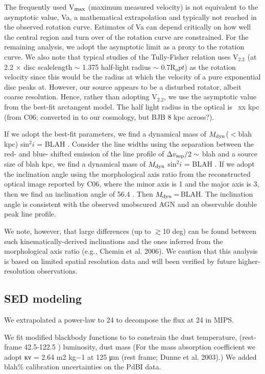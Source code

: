\documentclass[]{emulateapj}
\begin{document}
The frequently used V$_{\rm max}$ (maximum measured velocity) is not equivalent to the
asymptotic value, Va, a mathematical extrapolation and typically not reached in
the observed rotation curve. Estimates of Va can depend critically on how well
the central region and turn over of the rotation curve are constrained. For the
remaining analysis, we adopt the asymptotic limit as a proxy to the rotation
curve. We also note that typical studies of the Tully-Fisher relation uses V$_2.2$ (at 2.2 $\times$ disc scalelength $\sim$ 1.375 half-light radius $\sim$ 0.7R$_opt$) as the rotation
velocity since this would be the radius at which the velocity of a pure
exponential disc peaks at. However, our source appears to be a disturbed
rotator, albeit coarse resolution. Hence, rather than adopting V$_2.2$, we use the
asymptotic value from the best-fit arctangent model. The half light radius in the
optical is ~xx kpc (from C06; converted in to our cosmology, but BJB 8 kpc
across?).

If we adopt the best-fit parameters, we find a dynamical mass of $M_{\rm dyn}$($<$blah kpc) sin$^2 i$ = BLAH \Msun. Consider the line widths using the separation between
the red- and blue- shifted emission of the \bco line profile of $\Delta v_{\rm sep}/2 \sim$ blah \kms and a source size of blah kpc, we find a dynamical mass of $M_{\rm dyn}$
sin$^2 i$ = BLAH \Msun. If we adopt the inclination angle using the morphological axis ratio from the
reconstructed optical image reported by C06, where the minor axis is 1 and the major axis is 3, then we find an inclination angle of 56.4
\degr. Then $M_{\rm dyn}$\,=\,BLAH. The inclination angle is consistent with the observed unobscured AGN and an observable double peak line profile.

We note, however, that large differences (up to $\gtrsim$10 deg) can be found between such kinematically-derived inclinations and the ones inferred from the morphological
axis ratio (e.g., Chemin et al. 2006). We caution that this analysis is based on limited spatial resolution data and will been verified by future higher-resolution observations.

\subsection{SED modeling} \label{sec:SED}
We extrapolated a power-law to 24 \micron to decompose the flux
at 24 \micron in MIPS.

We fit modified blackbody functions to
to constrain the dust temperature, \fir (rest-frame 42.5-122.5 \micron) luminosity, dust mass (For the mass absorption coefficient we adopt κν = 2.64 m2 kg−1 at 125 μm (rest frame; Dunne et al. 2003).)
We added blah\% calibration uncertainties on the PdBI data.
\end{document}
